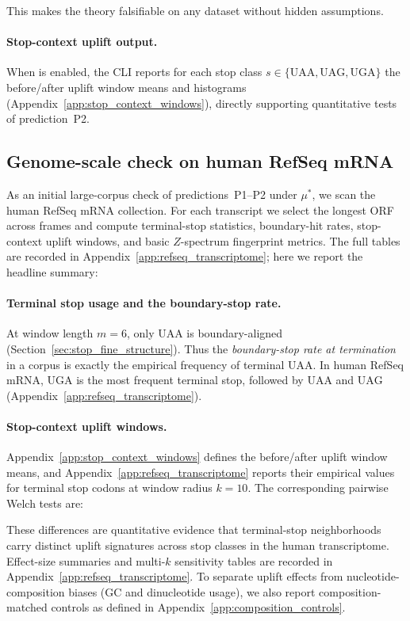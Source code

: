This makes the theory falsifiable on any dataset without hidden assumptions.

\paragraph{Stop-context uplift output.}
When  is enabled, the CLI reports for each stop class $s\in\{\mathrm{UAA,UAG,UGA}\}$ the before/after uplift window means and histograms (Appendix~\ref{app:stop_context_windows}), directly supporting quantitative tests of prediction~P2.

\subsection{Genome-scale check on human RefSeq mRNA}
\label{sec:refseq_transcriptome_check}

As an initial large-corpus check of predictions~P1--P2 under $\mu^\ast$, we scan the human RefSeq mRNA collection.
For each transcript we select the longest ORF across frames and compute terminal-stop statistics, boundary-hit rates, stop-context uplift windows, and basic $Z$-spectrum fingerprint metrics.
The full tables are recorded in Appendix~\ref{app:refseq_transcriptome}; here we report the headline summary:


\paragraph{Terminal stop usage and the boundary-stop rate.}
At window length $m=6$, only $\mathrm{UAA}$ is boundary-aligned (Section~\ref{sec:stop_fine_structure}).
Thus the \emph{boundary-stop rate at termination} in a corpus is exactly the empirical frequency of terminal $\mathrm{UAA}$.
In human RefSeq mRNA, $\mathrm{UGA}$ is the most frequent terminal stop, followed by $\mathrm{UAA}$ and $\mathrm{UAG}$ (Appendix~\ref{app:refseq_transcriptome}).

\paragraph{Stop-context uplift windows.}
Appendix~\ref{app:stop_context_windows} defines the before/after uplift window means, and Appendix~\ref{app:refseq_transcriptome} reports their empirical values for terminal stop codons at window radius $k=10$.
The corresponding pairwise Welch tests are:

These differences are quantitative evidence that terminal-stop neighborhoods carry distinct uplift signatures across stop classes in the human transcriptome.
Effect-size summaries and multi-$k$ sensitivity tables are recorded in Appendix~\ref{app:refseq_transcriptome}.
To separate uplift effects from nucleotide-composition biases (GC and dinucleotide usage), we also report composition-matched controls as defined in Appendix~\ref{app:composition_controls}.

